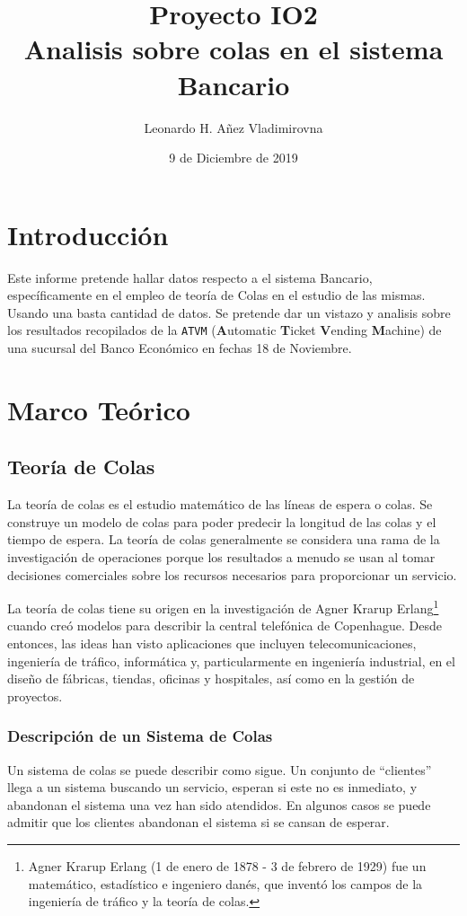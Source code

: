 \documentclass[10pt,letterpaper]{report}
\author{Leonardo H. Añez Vladimirovna}
\title{Proyecto IO2\\Analisis sobre colas en el sistema Bancario}
\date{9 de Diciembre de 2019}
\begin{document}
\maketitle
\section*{Introducción}
Este informe pretende hallar datos respecto a el sistema Bancario, específicamente en el empleo de teoría de Colas en el estudio de las mismas. Usando una basta cantidad de datos. Se pretende dar un vistazo y analisis sobre los resultados recopilados de la \texttt{ATVM} (\textbf{A}utomatic \textbf{T}icket \textbf{V}ending \textbf{M}achine) de una sucursal del Banco Económico en fechas 18 de Noviembre.
\section*{Marco Teórico}
\subsection*{Teoría de Colas}
La teoría de colas es el estudio matemático de las líneas de espera o colas. Se construye un modelo de colas para poder predecir la longitud de las colas y el tiempo de espera. La teoría de colas generalmente se considera una rama de la investigación de operaciones porque los resultados a menudo se usan al tomar decisiones comerciales sobre los recursos necesarios para proporcionar un servicio.

La teoría de colas tiene su origen en la investigación de Agner Krarup Erlang\footnote{Agner Krarup Erlang (1 de enero de 1878 - 3 de febrero de 1929) fue un matemático, estadístico e ingeniero danés, que inventó los campos de la ingeniería de tráfico y la teoría de colas.} cuando creó modelos para describir la central telefónica de Copenhague. Desde entonces, las ideas han visto aplicaciones que incluyen telecomunicaciones, ingeniería de tráfico, informática y, particularmente en ingeniería industrial, en el diseño de fábricas, tiendas, oficinas y hospitales, así como en la gestión de proyectos.
\subsubsection*{Descripción de un Sistema de Colas}
Un sistema de colas se puede describir como sigue. Un conjunto de ``clientes'' llega  a  un  sistema buscando  un  servicio,  esperan  si  este  no  es  inmediato,  y  abandonan  el  sistema  una  vez  han  sido  atendidos.  En  algunos  casos  se  puede  admitir que los clientes abandonan el sistema si se cansan de esperar.
\end{document}
